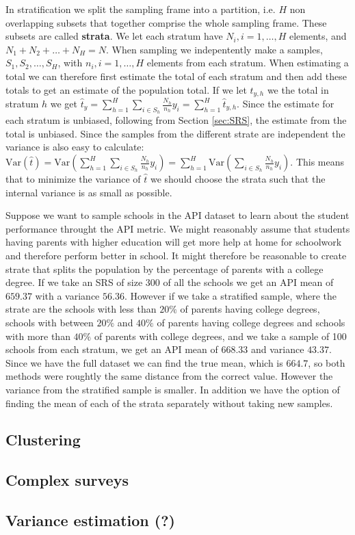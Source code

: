 \documentclass{article}
\begin{document}
In stratification we split the sampling frame into a partition, i.e. \(H\) non
overlapping subsets that together comprise the whole sampling frame. These
subsets are called \textbf{strata}. We let each stratum have \(N_i, i = 1, \dots
, H\) elements, and \(N_1 + N_2 + \dots + N_H = N\). When sampling we
indepentently make a samples, \(S_1, S_2, \dots, S_H\), with \(n_i, i = 1, \dots
, H\) elements from each stratum. When
estimating a total we can therefore first estimate the total of each stratum and
then add these totals to get an estimate of the population total.
If we let \(t_{y,h}\) we the total in stratum \(h\) we get \(\hat{t}_y =
\sum_{h = 1}^H\sum_{i \in S_h}\frac{N_h}{n_h}y_i = \sum_{h = 1}^H \hat{t}_{y,h}\). Since the estimate for each
stratum is unbiased, following from Section \ref{sec:SRS}, the estimate from the
total is unbiased.
Since the samples from the different strate are independent the variance is also
easy to calculate: \(\mathrm{Var}(\hat{t}) = \mathrm{Var}\left(\sum_{h =
    1}^H\sum_{i \in S_h}\frac{N_h}{n_h}y_i\right) = \sum_{h =
    1}^H\mathrm{Var}\left(\sum_{i \in S_h}\frac{N_h}{n_h}y_i\right)\). This
means that to minimize the variance of \(\hat{t}\) we should choose the strata
such that the internal variance is as small as possible.

Suppose we want to sample schools in the API dataset to learn about the student
performance throught the API metric. We might reasonably assume that students
having parents with higher education will get more help at home for schoolwork
and therefore perform better in school. It might therefore be reasonable to
create strate that splits the population by the percentage of parents with a
college degree. If we take an SRS of size \(300\) of all the schools we get an API mean of
\(659.37\) with a variance \(56.36\). However if we take a stratified sample,
where the strate are the schools with less than \(20\%\) of parents having
college degrees, schools with between \(20\%\) and \(40\%\) of parents having
college degrees and schools with more than \(40\%\) of parents with college
degrees, and we take a sample of 100 schools from each stratum, we get an API
mean of \(668.33\) and variance \(43.37\). Since we have the full dataset we can
find the true mean, which is \(664.7\), so both methods were roughtly the same
distance from the correct value. However the variance from the stratified sample
is smaller. In addition we have the option of finding the mean of each of the
strata separately without taking new samples.


\subsection{Clustering}

\subsection{Complex surveys}

\subsection{Variance estimation (?)}
\end{document}
